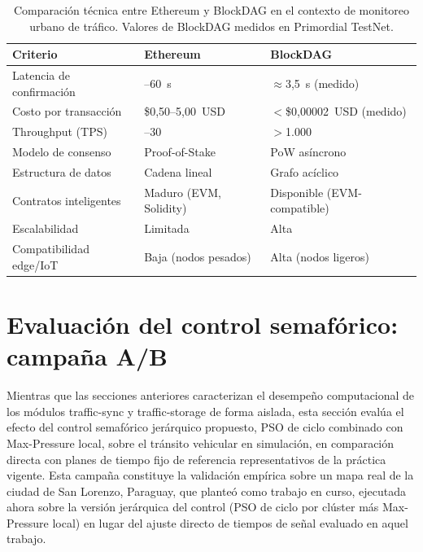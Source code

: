 \begin{table}[htbp]
\renewcommand{\arraystretch}{1.3}
\caption{Comparación técnica entre Ethereum y BlockDAG en el contexto de monitoreo
urbano de tráfico. Valores de BlockDAG medidos en Primordial TestNet.}
\label{tab:comparativa_blockchain}
\centering
\footnotesize
\setlength{\tabcolsep}{6pt}
\begin{tabular}{@{}>{\centering\arraybackslash}p{}>{\centering\arraybackslash}p{}>{\centering\arraybackslash}p{}@{}}
\hline
\textbf{Criterio} & \textbf{Ethereum} & \textbf{BlockDAG} \\
\hline
Latencia de confirmación
  & 15--60~s \cite{conoscenti2016blockchain,garay2015backbone}
  & $\approx$3,5~s (medido) \\
Costo por transacción
  & \$0{,}50--5{,}00~USD \cite{eckermann2021blockchain}
  & $<$\$0{,}00002~USD (medido) \\
Throughput (TPS)
  & 15--30 \cite{buterin2014ethereum}
  & $>$1.000 \cite{sompolinsky2021phantom} \\
Modelo de consenso
  & Proof-of-Stake
  & PoW asíncrono \\
Estructura de datos
  & Cadena lineal
  & Grafo acíclico \\
Contratos inteligentes
  & Maduro (EVM, Solidity)
  & Disponible (EVM-compatible) \\
Escalabilidad
  & Limitada
  & Alta \\
Compatibilidad edge/IoT
  & Baja (nodos pesados)
  & Alta (nodos ligeros) \\
\hline
\end{tabular}
\end{table}

\section{Evaluación del control semafórico: campaña A/B}
\label{sec:experimentos_control_ab}

Mientras que las secciones anteriores caracterizan el desempeño computacional de los
módulos traffic-sync y traffic-storage de forma aislada, esta sección evalúa el
efecto del control semafórico jerárquico propuesto, PSO de ciclo combinado con
Max-Pressure local, sobre el tránsito vehicular en simulación, en comparación directa
con planes de tiempo fijo de referencia representativos de la práctica vigente.
Esta campaña constituye la validación empírica sobre un mapa real de la ciudad de San
Lorenzo, Paraguay, que \cite{chilecon2025} planteó como trabajo en curso, ejecutada ahora
sobre la versión jerárquica del control (PSO de ciclo por clúster más Max-Pressure local)
en lugar del ajuste directo de tiempos de señal evaluado en aquel trabajo.

